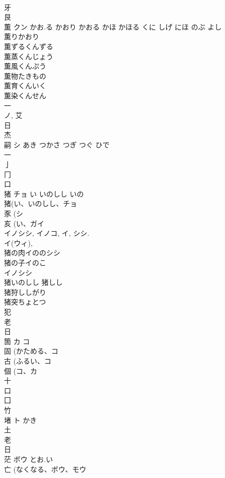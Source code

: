 \documentclass[8pt]{extreport}
\begin{document}
\begin{CJK}{UTF8}{min}
\\	牙 
\\	艮 
\\	薫	クン	かお.る かおり かおる かほ かほる くに しげ にほ のぶ よし	
\\	薫りかおり 
\\	薫ずるくんずる 
\\	薫蒸くんじょう 
\\	薫風くんぷう 
\\	薫物たきもの 
\\	薫育くんいく 
\\	薫染くんせん 
\\	一 
\\	ノ, 艾 
\\	日 
\\	杰	
\\	嗣	シ	あき つかさ つぎ つぐ ひで	
\\	一 
\\	亅 
\\	冂 
\\	口 
\\	猪	チョ	い いのしし いの	
\\	猪(い、いのしし、チョ 
\\	豕 (シ 
\\	亥 (い、ガイ 
\\	イノシシ, イノコ, イ, シシ. 
\\	イ(ウィ), 
\\	猪の肉イののシシ 
\\	猪の子イのこ 
\\	イノシシ 
\\	猪いのしし 猪しし 
\\	猪狩ししがり 
\\	猪突ちょとつ 
\\	犯 
\\	老 
\\	日 
\\	箇	カ コ		
\\	固 (かためる、コ 
\\	古 (ふるい、コ 
\\	個 (コ、カ 
\\	十 
\\	口 
\\	囗 
\\	竹 
\\	堵	ト	かき	
\\	土 
\\	老 
\\	日 
\\	茫	ボウ	とお.い	
\\	亡 (なくなる、ボウ、モウ 

\end{CJK}
\end{document}

